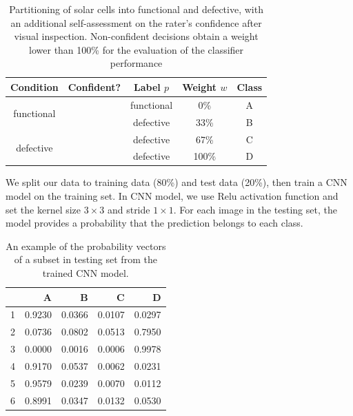 \documentclass[12pt]{article}
\newcommand{\cmark}{\ding{51}}%
\newcommand{\xmark}{\ding{55}}%
\begin{document}
\begin{table}[h!]
	\centering
	\caption{Partitioning of solar cells into functional and defective, with an additional self-assessment on the rater's confidence after visual inspection. Non-confident decisions obtain a weight lower than 100\% for the evaluation of the classifier performance }
	\begin{tabular}{c|c|c|c|c}
		\hline
		\hline
		Condition  & Confident?  &  Label $p$ & Weight $w$ & Class \\
		\hline
		\multirow{2}{*}{functional} & \cmark & functional & 0\% & A\\
		& \xmark& defective  & 33\% & B\\
		\hline
		\multirow{2}{*}{defective} & \xmark & defective & 67\% & C\\
		& \cmark & defective & 100\%  &D\\
		\hline
		\hline
	\end{tabular}
	
	
	
	\label{tbl:el.label}
	
\end{table}

We split our data to training data (80\%) and test data (20\%), then train a CNN model on the training set. In CNN model, we use Relu activation function and set the kernel size $3 \times 3$ and stride $1 \times 1$. For each image in the testing set, the model provides a probability that the prediction belongs to each class.


\begin{table}[ht]
\centering
\caption{An example of the probability vectors of a subset in testing set from the trained CNN model.}
\begin{tabular}{rrrrr}
  \hline
 & A & B & C & D \\
  \hline
1 & 0.9230 & 0.0366 & 0.0107 & 0.0297 \\
  2 & 0.0736 & 0.0802 & 0.0513 & 0.7950 \\
  3 & 0.0000 & 0.0016 & 0.0006 & 0.9978 \\
  4 & 0.9170 & 0.0537 & 0.0062 & 0.0231 \\
  5 & 0.9579 & 0.0239 & 0.0070 & 0.0112 \\
  6 & 0.8991 & 0.0347 & 0.0132 & 0.0530 \\
   \hline
\end{tabular}
\end{table}
\end{document}
